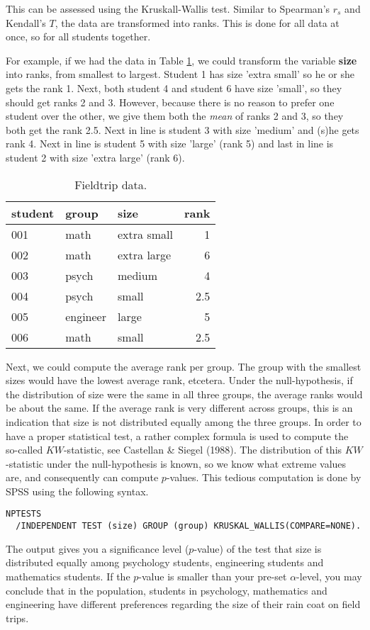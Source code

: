 This can be assessed using the Kruskall-Wallis test. Similar to Spearman's $r_s$ and Kendall's $T$, the data are transformed into ranks. This is done for all data at once, so for all students together.

For example, if we had the data in Table \ref{tab:fieldtrip_1}, we could transform the variable \textbf{size} into ranks, from smallest to largest. Student 1 has size 'extra small' so he or she gets the rank 1. Next, both student 4 and student 6 have size 'small', so they should get ranks 2 and 3. However, because there is no reason to prefer one student over the other, we give them both the \textit{mean} of ranks 2 and 3, so they both get the rank 2.5. Next in line is student 3 with size 'medium' and (s)he gets rank 4. Next in line is student 5 with size 'large' (rank 5) and last in line is student 2 with size 'extra large' (rank 6).  


\begin{table}
\label{tab:fieldtrip_1}
\caption{Fieldtrip data.}
 \begin{tabular}{lllr}
 student & group & size & rank\\ \hline
 001 & math & extra small & 1\\
 002 & math & extra large & 6\\
 003 & psych & medium & 4\\
 004 & psych & small & 2.5\\
 005 & engineer & large & 5 \\
 006 & math & small & 2.5 \\
 \end{tabular}
\end{table}


Next, we could compute the average rank per group. The group with the smallest sizes would have the lowest average rank, etcetera. Under the null-hypothesis, if the distribution of size were the same in all three groups, the average ranks would be about the same. If the average rank is very different across groups, this is an indication that size is not distributed equally among the three groups. In order to have a proper statistical test, a rather complex formula is used to compute the so-called $KW$-statistic, see Castellan \& Siegel (1988). The distribution of this $KW$-statistic under the null-hypothesis is known, so we know what extreme values are, and consequently can compute $p$-values. This tedious computation is done by SPSS using the following syntax. 

\begin{verbatim}
NPTESTS 
  /INDEPENDENT TEST (size) GROUP (group) KRUSKAL_WALLIS(COMPARE=NONE).
\end{verbatim}


The output gives you a significance level ($p$-value) of the test that size is distributed equally among psychology students, engineering students and mathematics students. If the $p$-value is smaller than your pre-set $\alpha$-level, you may conclude that in the population, students in psychology, mathematics and engineering have different preferences regarding the size of their rain coat on field trips. 



